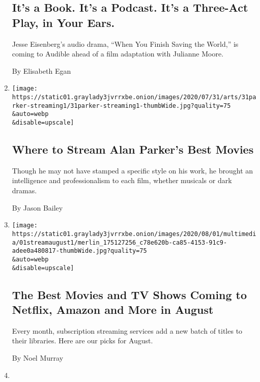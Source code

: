 \begin{enumerate}
{  \subsection{It's a Book. It's a Podcast. It's a Three-Act Play, in
  Your
  Ears.}\label{its-a-book-its-a-podcast-its-a-three-act-play-in-your-ears}}

  Jesse Eisenberg's audio drama, ``When You Finish Saving the World,''
  is coming to Audible ahead of a film adaptation with Julianne Moore.

  By Elisabeth Egan
\item
  \href{/2020/07/31/movies/alan-parker-stream.html}{}

  \texttt{[image: https://static01.graylady3jvrrxbe.onion/images/2020/07/31/arts/31parker-streaming1/31parker-streaming1-thumbWide.jpg?quality=75\\\&auto=webp\\\&disable=upscale]}

  \hypertarget{where-to-stream-alan-parkers-best-movies}{%
  \subsection{Where to Stream Alan Parker's Best
  Movies}\label{where-to-stream-alan-parkers-best-movies}}

  Though he may not have stamped a specific style on his work, he
  brought an intelligence and professionalism to each film, whether
  musicals or dark dramas.

  By Jason Bailey
\item
  \href{/2020/07/31/arts/television/new-to-stream-netflix.html}{}

  \texttt{[image: https://static01.graylady3jvrrxbe.onion/images/2020/08/01/multimedia/01streamaugust1/merlin\_175127256\_c78e620b-ca85-4153-91c9-adee0a480817-thumbWide.jpg?quality=75\\\&auto=webp\\\&disable=upscale]}

  \hypertarget{the-best-movies-and-tv-shows-coming-to-netflix-amazon-and-more-in-august}{%
  \subsection{The Best Movies and TV Shows Coming to Netflix, Amazon and
  More in
  August}\label{the-best-movies-and-tv-shows-coming-to-netflix-amazon-and-more-in-august}}

  Every month, subscription streaming services add a new batch of titles
  to their libraries. Here are our picks for August.

  By Noel Murray
\item
  \href{/video/movies/100000007265338/palm-springs-scene.html}{}


\end{enumerate}
